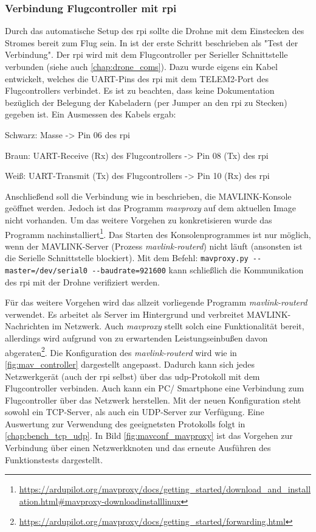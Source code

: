 \subsubsection{Verbindung Flugcontroller mit \gls{rpi}}
Durch das automatische Setup des \gls{rpi} sollte die Drohne mit dem Einstecken des Stromes bereit zum Flug sein. In \cite[Kapitel 4.3.6]{wirthErweiterungBestehendenDrohne2022} ist der erste Schritt beschrieben als "Test der Verbindung". Der \gls{rpi} wird mit dem Flugcontroller  per Serieller Schnittstelle verbunden (siehe auch \cref{chap:drone_coms}). Dazu wurde eigens ein Kabel entwickelt, welches die UART-Pins des \gls{rpi} mit dem TELEM2-Port des Flugcontrollers verbindet. Es ist zu beachten, dass keine Dokumentation bezüglich der Belegung der Kabeladern (per Jumper an den \gls{rpi} zu Stecken) gegeben ist. Ein Ausmessen des Kabels ergab:
\begin{compactitem}
    \item Schwarz: Masse -> Pin 06 des \gls{rpi}
    \item Braun: UART-Receive (Rx) des Flugcontrollers -> Pin 08 (Tx) des \gls{rpi}
    \item Weiß: UART-Transmit (Tx) des Flugcontrollers -> Pin 10 (Rx) des \gls{rpi}
\end{compactitem}
Anschließend soll die Verbindung wie in \cite[Kapitel 4.3.6]{wirthErweiterungBestehendenDrohne2022} beschrieben, die MAVLINK-Konsole geöffnet werden. Jedoch ist das Programm \textit{mavproxy} auf dem aktuellen Image nicht vorhanden. Um das weitere Vorgehen zu konkretisieren wurde das Programm nachinstalliert\footnote{\url{https://ardupilot.org/mavproxy/docs/getting_started/download_and_installation.html\#mavproxy-downloadinstalllinux}}. Das Starten des Konsolenprogrammes ist nur möglich, wenn der MAVLINK-Server (Prozess \textit{mavlink-routerd}) nicht läuft (ansonsten ist die Serielle Schnittstelle blockiert). Mit dem Befehl: 
\texttt{mavproxy.py -{}-master=/dev/serial0 -{}-baudrate=921600}
kann schließlich die Kommunikation des \gls{rpi} mit der Drohne verifiziert werden.

Für das weitere Vorgehen wird das allzeit vorliegende Programm \textit{mavlink-routerd} verwendet. Es arbeitet als Server im Hintergrund und verbreitet MAVLINK-Nachrichten im Netzwerk. Auch \textit{mavproxy} stellt solch eine Funktionalität bereit, allerdings wird aufgrund von zu erwartenden Leistungseinbußen davon abgeraten\footnote{\url{https://ardupilot.org/mavproxy/docs/getting_started/forwarding.html}}. Die Konfiguration des \textit{mavlink-routerd} wird wie in \ref{fig:mav_controller} dargestellt angepasst. Dadurch kann sich jedes Netzwerkgerät (auch der \gls{rpi} selbst) über das \gls{udp}-Protokoll mit dem Flugcontroller verbinden. Auch kann ein PC/ Smartphone eine Verbindung zum Flugcontroller über das Netzwerk herstellen. Mit der neuen Konfiguration steht sowohl ein TCP-Server, als auch ein UDP-Server zur Verfügung. Eine Auswertung zur Verwendung des geeignetsten Protokolls folgt in \cref{chap:bench_tcp_udp}. In Bild \ref{fig:mavconf_mavproxy} ist das Vorgehen zur Verbindung über einen Netzwerkknoten und das erneute Ausführen des Funktionstests dargestellt.

